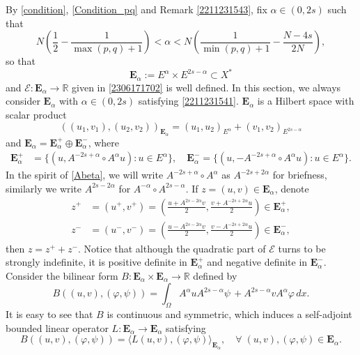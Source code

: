 \documentclass[10pt]{article}
\numberwithin{equation}{section}
\numberwithin{equation}{section}
\begin{document}
By  \eqref{condition}, \eqref{Condition_pq} and Remark \ref{2211231543},  fix $\alpha\in (0, 2s)$ such that
\begin{equation}\label{2211231541}
N\left(\frac12-\frac{1}{\max(p,q)+1}\right)<\alpha<N\left(\frac{1}{\min(p, q)+1}-\frac{N-4s}{2N}\right),
\end{equation}
so that
$$\mathbf{E}_{\alpha} :=E^{\alpha}\times E^{2s-\alpha}\subset X^*$$
and $\mathcal{E}: \mathbf{E}_{\alpha}\to \mathbb{R}$ given in \eqref{2306171702} is well defined.  In this section, we always consider $\mathbf{E}_{\alpha}$ with $\alpha \in (0, 2s)$ satisfying \eqref{2211231541}. $\mathbf{E}_{\alpha}$ is a Hilbert space with scalar product
\[
( (u_1, v_1), (u_2, v_2))_{\mathbf{E}_{\alpha}}=(u_1, u_2)_{E^\alpha}+(v_1, v_2)_{E^{2s-\alpha}}
\]
and $\mathbf{E}_{\alpha}=\mathbf{E}^+_{\alpha}\oplus \mathbf{E}^-_{\alpha}$, where
\[
\begin{split}
\mathbf{E}^+_{\alpha}&=\big\{(u, A^{-2s+\alpha}\circ A^{\alpha} u): u\in E^\alpha\big\},\quad \mathbf{E}^-_{\alpha}=\big\{(u, -A^{-2s+\alpha}\circ A^{\alpha} u): u\in E^\alpha\big\}.
\end{split}
\]
In the spirit of \eqref{Abeta}, we will write $A^{-2s+\alpha}\circ A^{\alpha}$ as $A^{-2s+2\alpha}$ for briefness, similarly we write $A^{2s-2\alpha}$ for $A^{-\alpha}\circ A^{2s-\alpha}$. If $z=(u,v)\in \mathbf{E}_{\alpha}$, denote
\[
\begin{split}
z^+&=(u^+,v^+)=\left(\frac{u+A^{2s-2\alpha}v}{2},\frac{v+A^{-2s+2\alpha}u}{2} \right)\in \mathbf{E}^+_{\alpha},\\
z^-&=(u^-,v^-)=\left(\frac{u-A^{2s-2\alpha}v}{2},\frac{v-A^{-2s+2\alpha} u}{2}\right)\in \mathbf{E}^-_{\alpha},
\end{split}
\]
then $z=z^++z^-$. Notice that although the quadratic part of $\mathcal{E}$ turns to be strongly indefinite, it is positive definite in $\mathbf{E}^+_{\alpha}$ and negative definite in $\mathbf{E}^-_{\alpha}$.  Consider the bilinear form $B: \mathbf{E}_{\alpha} \times \mathbf{E}_{\alpha} \to \mathbb{R}$ defined by
\begin{equation}\label{2401062223}
B((u,v), (\varphi, \psi))=\int_{\Omega}A^\alpha uA^{2s-\alpha}\psi\, +A^{2s-\alpha} vA^{\alpha}\varphi\, dx.
\end{equation}
It is easy to see that $B$ is continuous and symmetric, which induces a self-adjoint bounded linear operator $L: \mathbf{E}_{\alpha}\to \mathbf{E}_{\alpha}$ satisfying
\begin{equation}\label{2401131356}
B((u, v), (\varphi, \psi))=\big\langle L(u, v), (\varphi, \psi)\big\rangle_{\mathbf{E}_{\alpha}},\quad\forall\; (u, v), (\varphi, \psi)\in \mathbf{E}_{\alpha}.
\end{equation}
\end{document}
